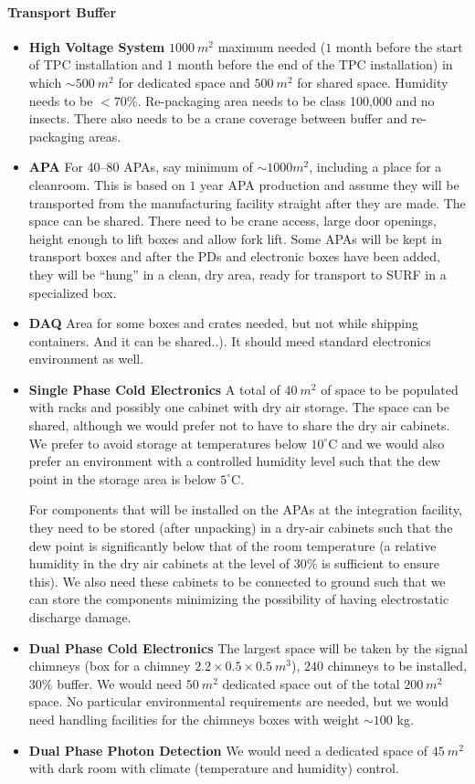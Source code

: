 \paragraph{\bf Transport Buffer}
\begin{itemize}
 \item {\bf High Voltage System} $1000~m^2$ maximum needed ($1$ month before the start of 
TPC installation and $1$ month before the end of the TPC installation) in which
$\sim500~m^2$ for dedicated space and  $500~m^2$ for shared space. 
Humidity needs to be $<70\%$. Re-packaging area needs to be class 100,000
and no insects. There also needs to be a crane coverage between buffer and re-packaging areas.
  \item {\bf APA} For 40--80 APAs, say 
minimum of $\sim1000m^2$, including a place for a cleanroom.
This is based on $1$ year APA production 
and assume they will be transported from the manufacturing facility straight after they are made.
The space can be shared.
There need to be crane access, large door openings, height enough to lift boxes and allow fork lift.
 Some APAs will be kept in transport boxes and after the PDs and electronic boxes have been added, 
they will be ``hung'' in a clean, dry area, ready for transport to SURF in a specialized box.
  \item {\bf DAQ} Area for some boxes and crates needed, but not while shipping containers.
And it can be shared..). It should meed standard electronics environment as well.
  \item {\bf Single Phase Cold Electronics} A total of $40~m^2$ of space
to be populated with racks and possibly one cabinet with dry air storage.
The space can be shared, although we would prefer not to have to share the dry air cabinets.
We prefer to avoid storage at temperatures below $10^\circ$C and we would also prefer an environment with a controlled humidity level such that the dew point in the storage area 
is below $5^\circ$C. 

For components that will be installed on the APAs at the integration facility,
they need to be stored (after unpacking) in a dry-air cabinets such that the dew point is 
significantly below that of the room temperature (a relative humidity in the dry air cabinets at the 
level of $30\%$ is sufficient to ensure this). We also need these cabinets to be connected to ground 
such that we can store the components minimizing the possibility of having electrostatic discharge 
damage.
  \item {\bf Dual Phase Cold Electronics} The largest space will be taken by the signal chimneys (box for a chimney $2.2\times0.5\times0.5~m^3$), $240$ chimneys to be installed, $30\%$ buffer.
We would need $50~m^2$ dedicated space out of the total $200~m^2$ space.
No particular environmental requirements are needed, but we would need
handling facilities for the chimneys boxes with weight $\sim100$ kg.
   \item {\bf Dual Phase Photon Detection} We would need a dedicated space of
$45~m^2$ with dark room with climate (temperature and humidity) control.
\end{itemize}

